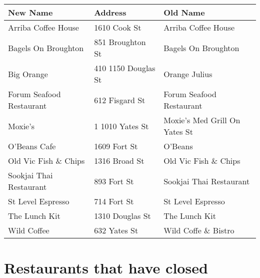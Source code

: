 \documentclass[9pt]{article}
\begin{document}
\begin{center}
\begin{tabular}{l|l|l}
\textbf{New Name} & \textbf{Address} & \textbf{Old Name}\\
\hline
Arriba Coffee House & 1610 Cook St & Arriba Coffee House\\
Bagels On Broughton & 851 Broughton St & Bagels On Broughton\\
Big Orange & 410 1150 Douglas St & Orange Julius\\
Forum Seafood Restaurant & 612 Fisgard St & Forum Seafood Restaurant\\
Moxie's & 1 1010 Yates St & Moxie's Med Grill On Yates St\\
O'Beans Cafe & 1609 Fort St & O'Beans\\
Old Vic Fish \& Chips & 1316 Broad St & Old Vic Fish \& Chips\\
Sookjai Thai Restaurant & 893 Fort St & Sookjai Thai Restaurant\\
St Level Espresso & 714 Fort St & St Level Espresso\\
The Lunch Kit & 1310 Douglas St & The Lunch Kit\\
Wild Coffee & 632 Yates St & Wild Coffe \& Bistro\\
\end{tabular}
\end{center}


\section{Restaurants that have closed}
\label{sec-3}
\end{document}
